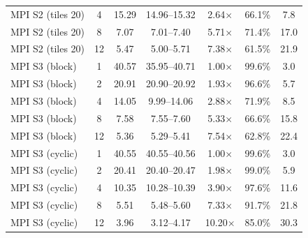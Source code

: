 \begin{table}[htbp]
\begin{tabular}{lcccccc}
MPI S2 (tiles 20) & 4 & 15.29 & 14.96--15.32 & 2.64$\times$ & 66.1\% & 7.8 \\
MPI S2 (tiles 20) & 8 & 7.07 & 7.01--7.40 & 5.71$\times$ & 71.4\% & 17.0 \\
MPI S2 (tiles 20) & 12 & 5.47 & 5.00--5.71 & 7.38$\times$ & 61.5\% & 21.9 \\
MPI S3 (block) & 1 & 40.57 & 35.95--40.71 & 1.00$\times$ & 99.6\% & 3.0 \\
MPI S3 (block) & 2 & 20.91 & 20.90--20.92 & 1.93$\times$ & 96.6\% & 5.7 \\
MPI S3 (block) & 4 & 14.05 & 9.99--14.06 & 2.88$\times$ & 71.9\% & 8.5 \\
MPI S3 (block) & 8 & 7.58 & 7.55--7.60 & 5.33$\times$ & 66.6\% & 15.8 \\
MPI S3 (block) & 12 & 5.36 & 5.29--5.41 & 7.54$\times$ & 62.8\% & 22.4 \\
MPI S3 (cyclic) & 1 & 40.55 & 40.55--40.56 & 1.00$\times$ & 99.6\% & 3.0 \\
MPI S3 (cyclic) & 2 & 20.41 & 20.40--20.47 & 1.98$\times$ & 99.0\% & 5.9 \\
MPI S3 (cyclic) & 4 & 10.35 & 10.28--10.39 & 3.90$\times$ & 97.6\% & 11.6 \\
MPI S3 (cyclic) & 8 & 5.51 & 5.48--5.60 & 7.33$\times$ & 91.7\% & 21.8 \\
MPI S3 (cyclic) & 12 & 3.96 & 3.12--4.17 & 10.20$\times$ & 85.0\% & 30.3 \\
\bottomrule
\end{tabular}
\end{table}
